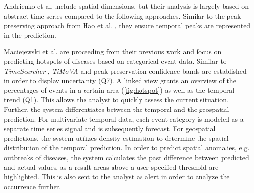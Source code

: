 \documentclass[electronic]{vgtc}             %
\begin{document}
Andrienko et al. \cite{Andrienko:2010} include spatial dimensions, but their analysis is largely based on abstract time series compared to the following approaches.
Similar to the peak preserving approach from Hao et al. \cite{Hao:2012}, they ensure temporal peaks are represented in the prediction. 

Maciejewski et al. \cite{maciejewski:2011} are proceeding from their previous work \cite{maciejewski:2008, maciejewski:2007} and focus on predicting hotspots of diseases based on categorical event data.
Similar to \textit{TimeSearcher} \cite{buono:2007}, \textit{TiMoVA} \cite{boegl:2013} and peak preservation \cite{Hao:2012} confidence bands are established in order to display uncertainty (Q7).
A linked view grants an overview of the percentages of events in a certain area (\autoref{fig:hotspot}) as well as the temporal trend (Q1).
This allows the analyst to quickly assess the current situation.
Further, the system differentiates between the temporal and the geospatial prediction.
For multivariate temporal data, each event category is modeled as a separate time series signal and is subsequently forecast. 
For geospatial predictions, the system utilizes density estimation to determine the spatial distribution of the temporal prediction. 
In order to predict spatial anomalies, e.g. outbreaks of diseases, the system calculates the past difference between predicted and actual values, as a result areas above a user-specified threshold are highlighted.
This is also sent to the analyst as alert in order to analyze the occurrence further.
\end{document}
